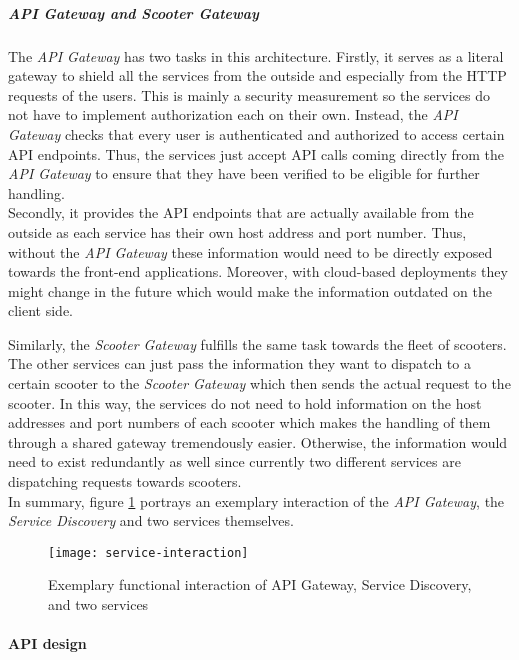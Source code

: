 \documentclass[12pt,a4paper]{report}
\begin{document}
\subparagraph{API Gateway and Scooter Gateway}
The \textit{API Gateway} has two tasks in this architecture.
Firstly, it serves as a literal gateway to shield all the services from
the outside and especially from the HTTP requests of the users.
This is mainly a security measurement so the services do not have to
implement authorization each on their own. Instead, the \textit{API Gateway}
checks that every user is authenticated and authorized to access certain
API endpoints. Thus, the services just accept API calls coming directly from
the \textit{API Gateway} to ensure that they have been verified to be eligible
for further handling.\\
Secondly, it provides the API endpoints that are actually available from the
outside as each service has their own host address and port number.
Thus, without the \textit{API Gateway} these information would need to be
directly exposed towards the front-end applications. Moreover, with cloud-based
deployments they might change in the future which would make the information
outdated on the client side.

Similarly, the \textit{Scooter Gateway} fulfills the same task towards the
fleet of scooters. The other services can just pass the
information they want to dispatch to a certain scooter to the
\textit{Scooter Gateway} which then sends the actual request to the scooter.
In this way, the services do not need to hold information on the host addresses
and port numbers of each scooter which makes the handling of them through
a shared gateway tremendously easier. Otherwise, the information would need
to exist redundantly as well since currently two different services are
dispatching requests towards scooters.\\

In summary, figure \ref{fig:service-interaction} portrays an exemplary interaction of the
\textit{API Gateway}, the \textit{Service Discovery} and two services themselves.

\begin{figure}[htb]
\centering
\texttt{[image: service-interaction]}
\caption{Exemplary functional interaction of API Gateway, Service Discovery, and two services}
\label{fig:service-interaction}
\end{figure}

\paragraph{API design} \label{construction-api_design}
\end{document}
